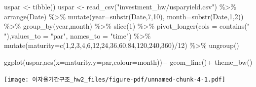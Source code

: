\documentclass[
  a4paper,
  DIV=11,
  numbers=noendperiod]{scrreprt}
\newenvironment{Shaded}{\begin{snugshade}}{\end{snugshade}}
\newcommand{\AttributeTok}[1]{\textcolor[rgb]{0.40,0.45,0.13}{#1}}
\newcommand{\DecValTok}[1]{\textcolor[rgb]{0.68,0.00,0.00}{#1}}
\newcommand{\FunctionTok}[1]{\textcolor[rgb]{0.28,0.35,0.67}{#1}}
\newcommand{\NormalTok}[1]{\textcolor[rgb]{0.00,0.23,0.31}{#1}}
\newcommand{\OtherTok}[1]{\textcolor[rgb]{0.00,0.23,0.31}{#1}}
\newcommand{\SpecialCharTok}[1]{\textcolor[rgb]{0.37,0.37,0.37}{#1}}
\newcommand{\StringTok}[1]{\textcolor[rgb]{0.13,0.47,0.30}{#1}}
\begin{document}
\begin{Shaded}
\begin{Highlighting}[]
\NormalTok{uspar }\OtherTok{\textless{}{-}} \FunctionTok{tibble}\NormalTok{()}
\NormalTok{uspar }\OtherTok{\textless{}{-}} \FunctionTok{read\_csv}\NormalTok{(}\StringTok{"investment\_hw/usparyield.csv"}\NormalTok{) }\SpecialCharTok{\%\textgreater{}\%} 
  \FunctionTok{arrange}\NormalTok{(Date) }\SpecialCharTok{\%\textgreater{}\%} 
  \FunctionTok{mutate}\NormalTok{(}\AttributeTok{year=}\FunctionTok{substr}\NormalTok{(Date,}\DecValTok{7}\NormalTok{,}\DecValTok{10}\NormalTok{),}
         \AttributeTok{month=}\FunctionTok{substr}\NormalTok{(Date,}\DecValTok{1}\NormalTok{,}\DecValTok{2}\NormalTok{)) }\SpecialCharTok{\%\textgreater{}\%} 
  \FunctionTok{group\_by}\NormalTok{(year,month) }\SpecialCharTok{\%\textgreater{}\%} 
  \FunctionTok{slice}\NormalTok{(}\DecValTok{1}\NormalTok{) }\SpecialCharTok{\%\textgreater{}\%} 
  \FunctionTok{pivot\_longer}\NormalTok{(}\AttributeTok{cols =} \FunctionTok{contains}\NormalTok{(}\StringTok{" "}\NormalTok{),}\AttributeTok{values\_to =} \StringTok{"par"}\NormalTok{, }\AttributeTok{names\_to =} \StringTok{"time"}\NormalTok{) }\SpecialCharTok{\%\textgreater{}\%} 
  \FunctionTok{mutate}\NormalTok{(}\AttributeTok{maturity=}\FunctionTok{c}\NormalTok{(}\DecValTok{1}\NormalTok{,}\DecValTok{2}\NormalTok{,}\DecValTok{3}\NormalTok{,}\DecValTok{4}\NormalTok{,}\DecValTok{6}\NormalTok{,}\DecValTok{12}\NormalTok{,}\DecValTok{24}\NormalTok{,}\DecValTok{36}\NormalTok{,}\DecValTok{60}\NormalTok{,}\DecValTok{84}\NormalTok{,}\DecValTok{120}\NormalTok{,}\DecValTok{240}\NormalTok{,}\DecValTok{360}\NormalTok{)}\SpecialCharTok{/}\DecValTok{12}\NormalTok{) }\SpecialCharTok{\%\textgreater{}\%} 
  \FunctionTok{ungroup}\NormalTok{()}
\end{Highlighting}
\end{Shaded}

\begin{Shaded}
\begin{Highlighting}[]
\FunctionTok{ggplot}\NormalTok{(uspar,}\FunctionTok{aes}\NormalTok{(}\AttributeTok{x=}\NormalTok{maturity,}\AttributeTok{y=}\NormalTok{par,}\AttributeTok{colour=}\NormalTok{month))}\SpecialCharTok{+}
  \FunctionTok{geom\_line}\NormalTok{()}\SpecialCharTok{+}
  \FunctionTok{theme\_bw}\NormalTok{()}
\end{Highlighting}
\end{Shaded}

\texttt{[image: 이자율기간구조\_hw2\_files/figure-pdf/unnamed-chunk-4-1.pdf]}
\end{document}
